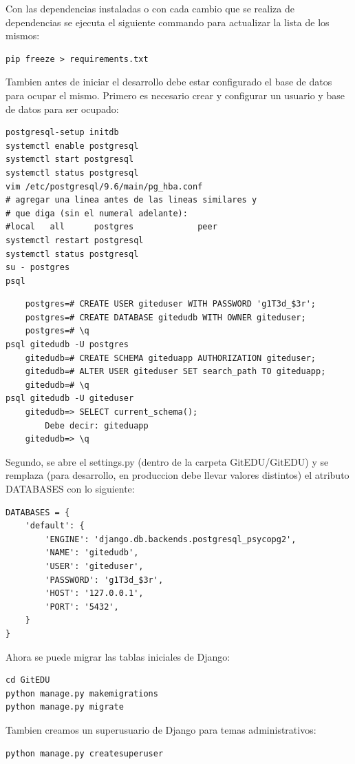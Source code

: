 Con las dependencias instaladas o con cada cambio que se realiza de dependencias se ejecuta el siguiente commando para actualizar la lista de los mismos:

\begin{lstlisting}
pip freeze > requirements.txt
\end{lstlisting}

Tambien antes de iniciar el desarrollo debe estar configurado el base de datos para ocupar el mismo. Primero es necesario crear y configurar un usuario y base de datos para ser ocupado:
\begin{lstlisting}
postgresql-setup initdb
systemctl enable postgresql
systemctl start postgresql
systemctl status postgresql
vim /etc/postgresql/9.6/main/pg_hba.conf
# agregar una linea antes de las lineas similares y
# que diga (sin el numeral adelante):
#local   all      postgres             peer
systemctl restart postgresql
systemctl status postgresql
su - postgres
psql
\end{lstlisting}
\begin{lstlisting}
	postgres=# CREATE USER giteduser WITH PASSWORD 'g1T3d_$3r';
	postgres=# CREATE DATABASE gitedudb WITH OWNER giteduser;
	postgres=# \q
psql gitedudb -U postgres
	gitedudb=# CREATE SCHEMA giteduapp AUTHORIZATION giteduser;
	gitedudb=# ALTER USER giteduser SET search_path TO giteduapp;
	gitedudb=# \q
psql gitedudb -U giteduser
	gitedudb=> SELECT current_schema();
		Debe decir: giteduapp
	gitedudb=> \q
\end{lstlisting}

Segundo, se abre el settings.py (dentro de la carpeta GitEDU/GitEDU) y se remplaza (para desarrollo, en produccion debe llevar valores distintos) el atributo DATABASES con lo siguiente:
\lstset{language=Python}
\begin{lstlisting}
DATABASES = {
    'default': {
        'ENGINE': 'django.db.backends.postgresql_psycopg2',
        'NAME': 'gitedudb',
        'USER': 'giteduser',
        'PASSWORD': 'g1T3d_$3r',
        'HOST': '127.0.0.1',
        'PORT': '5432',
    }
}
\end{lstlisting}
\lstset{language=Bash}

Ahora se puede migrar las tablas iniciales de Django:
\begin{lstlisting}
cd GitEDU
python manage.py makemigrations
python manage.py migrate
\end{lstlisting}

Tambien creamos un superusuario de Django para temas administrativos:
\begin{lstlisting}
python manage.py createsuperuser
\end{lstlisting}

